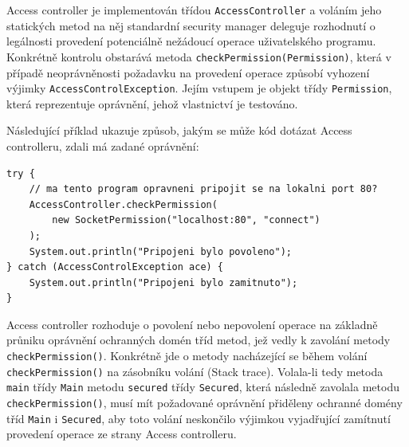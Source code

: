 Access controller je implementován třídou {\tt AccessController} a voláním jeho statických metod na něj standardní security manager deleguje rozhodnutí o legálnosti provedení potenciálně nežádoucí operace uživatelského programu. Konkrétně kontrolu obstarává metoda {\tt checkPermission(Permission)}, která v případě neoprávněnosti požadavku na provedení operace způsobí vyhození výjimky {\tt AccessControlException}. Jejím vstupem je objekt třídy {\tt Permission}, která reprezentuje oprávnění, jehož vlastnictví je testováno. \cite[5.5]{oaks}\cite[6]{oaks}

Následující příklad ukazuje způsob, jakým se může kód dotázat Access controlleru, zdali má zadané oprávnění: \cite[5.5]{oaks}

\begin{lstlisting}[caption=Příklad použití Systému řízení přístupu, label=pouzitiAC]
try {
    // ma tento program opravneni pripojit se na lokalni port 80?
    AccessController.checkPermission(
        new SocketPermission("localhost:80", "connect")
    );
    System.out.println("Pripojeni bylo povoleno");
} catch (AccessControlException ace) {
    System.out.println("Pripojeni bylo zamitnuto");
}
\end{lstlisting}

Access controller rozhoduje o povolení nebo nepovolení operace na základně průniku oprávnění ochranných domén tříd metod, jež vedly k zavolání metody {\tt checkPermission()}. Konkrétně jde o metody nacházející se během volání {\tt checkPermission()} na zásobníku volání (Stack trace). Volala-li tedy metoda {\tt main} třídy {\tt Main} metodu {\tt secured} třídy {\tt Secured}, která následně zavolala metodu {\tt checkPermission()}, musí mít požadované oprávnění přiděleny ochranné domény tříd {\tt Main} i {\tt Secured}, aby toto volání neskončilo výjimkou vyjadřující zamítnutí provedení operace ze strany Access controlleru. \cite[5.5]{oaks}\cite[6.1]{oaks}


%

